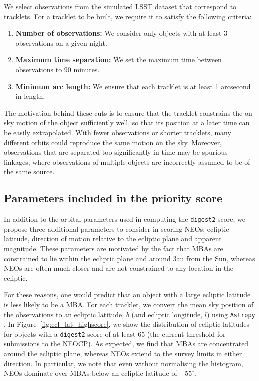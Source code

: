 \documentclass[twocolumn]{aastex631}
\newcommand{\dig}{\texttt{digest2}}
\begin{document}
We select observations from the simulated LSST dataset that correspond to tracklets. For a tracklet to be built, we require it to satisfy the following criteria:
\begin{enumerate}
    \item \textbf{Number of observations:} We consider only objects with at least 3 observations on a given night.
    \item \textbf{Maximum time separation:} We set the maximum time between observations to 90 minutes.
    \item \textbf{Minimum arc length:} We ensure that each tracklet is at least 1 arcsecond in length.
\end{enumerate}
The motivation behind these cuts is to ensure that the tracklet constrains the on-sky motion of the object sufficiently well, so that its position at a later time can be easily extrapolated. With fewer observations or shorter tracklets, many different orbits could reproduce the same motion on the sky. Moreover, observations that are separated too significantly in time may be spurious linkages, where observations of multiple objects are incorrectly assumed to be of the same source.

\subsection{Parameters included in the priority score}

In addition to the orbital parameters used in computing the \dig{} score, we propose three additional parameters to consider in scoring NEOs: ecliptic latitude, direction of motion relative to the ecliptic plane and apparent magnitude. These parameters are motivated by the fact that MBAs are constrained to lie within the ecliptic plane and around 3au from the Sun, whereas NEOs are often much closer and are not constrained to any location in the ecliptic.

For these reasons, one would predict that an object with a large ecliptic latitude is less likely to be a MBA. For each tracklet, we convert the mean sky position of the observations to an ecliptic latitude, $b$ (and ecliptic longitude, $l$) using \texttt{Astropy} \citep{astropy:2013,astropy:2018,astropy:2022}. In Figure~\ref{fig:ecl_lat_highscore}, we show the distribution of ecliptic latitudes for objects with a \dig{} score of at least 65 (the current threshold for submissions to the NEOCP). As expected, we find that MBAs are concentrated around the ecliptic plane, whereas NEOs extend to the survey limits in either direction. In particular, we note that even without normalising the histogram, NEOs dominate over MBAs below an ecliptic latitude of $-55^{\circ}$.
\end{document}
